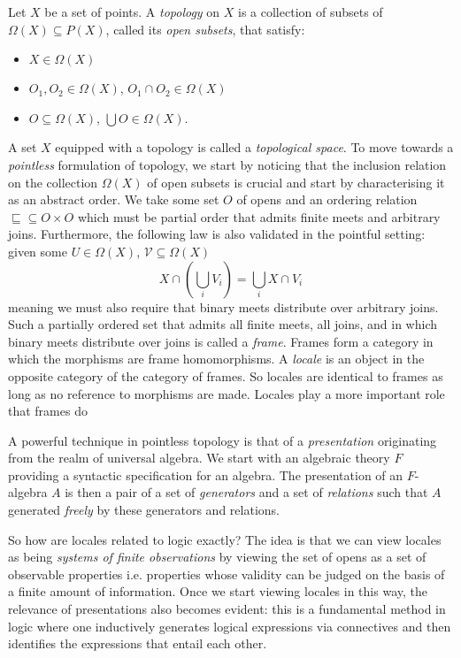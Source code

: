\documentclass{article}
\begin{document}
Let $X$ be a set of points. A \emph{topology} on $X$ is a collection of subsets of
$\Omega(X) \subseteq P(X)$, called its \emph{open subsets}, that satisfy:
\begin{itemize}
  \item $X \in \Omega(X)$
  \item $O_1, O_2 \in \Omega(X)$, $O_1 \cap O_2 \in \Omega(X)$
  \item $O \subseteq \Omega(X)$, $\bigcup O \in \Omega(X)$.
\end{itemize}

A set $X$ equipped with a topology is called a \emph{topological space}. To move towards a
\emph{pointless} formulation of topology, we start by noticing that the inclusion relation
on the collection $\Omega(X)$ of open subsets is crucial and start by characterising it as an
abstract order. We take some set $O$ of opens and an ordering relation $\sqsubseteq \subseteq O \times O$ which
must be partial order that admits finite meets and arbitrary joins. Furthermore, the
following law is also validated in the pointful setting: given some $U \in \Omega(X)$,
$\mathcal{V} \subseteq \Omega(X)$
\begin{equation*}
  X \cap (\bigcup_{i} V_i) = \bigcup_{i} X \cap V_i
\end{equation*}
meaning we must also require that binary meets distribute over arbitrary joins. Such a
partially ordered set that admits all finite meets, all joins, and in which binary meets
distribute over joins is called a \emph{frame}. Frames form a category in which the
morphisms are frame homomorphisms. A \emph{locale} is an object in the opposite category
of the category of frames. So locales are identical to frames as long as no reference to
morphisms are made. Locales play a more important role that frames do

A powerful technique in pointless topology is that of a \emph{presentation} originating
from the realm of universal algebra. We start with an algebraic theory $F$ providing a
syntactic specification for an algebra. The presentation of an $F$-algebra $A$ is then a
pair of a set of \emph{generators} and a set of \emph{relations} such that $A$ generated
\emph{freely} by these generators and relations.

So how are locales related to logic exactly? The idea is that we can view locales as being
\emph{systems of finite observations} by viewing the set of opens as a set of observable
properties i.e. properties whose validity can be judged on the basis of a finite amount of
information. Once we start viewing locales in this way, the relevance of presentations
also becomes evident: this is a fundamental method in logic where one inductively
generates logical expressions via connectives and then identifies the expressions that
entail each other.
\end{document}
